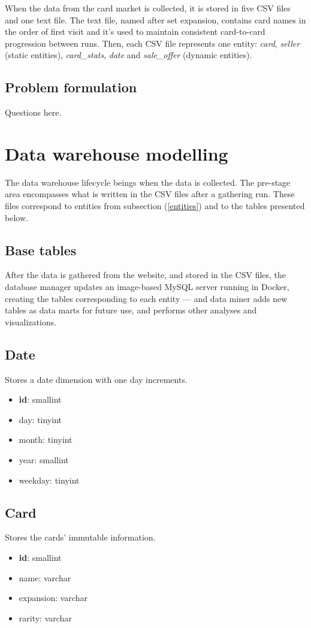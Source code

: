 When the data from the card market is collected, it is stored in five CSV files and one text file. The text file, named after set expansion, contains card names in the order of first visit and it's used to maintain consistent card-to-card progression between runs. Then, each CSV file represents one entity: \textit{card}, \textit{seller} (static entities), \textit{card\_stats}, \textit{date} and \textit{sale\_offer} (dynamic entities).

\subsection{Problem formulation}
Questions here.

\section{Data warehouse modelling}
The data warehouse lifecycle beings when the data is collected. The pre-stage area encompasses what is written in the CSV files after a gathering run. These files correspond to entities from subsection (\ref{entities}) and to the tables presented below.

\subsection{Base tables}
After the data is gathered from the website, and stored in the CSV files, the database manager updates an image-based MySQL server running in Docker, creating the tables corresponding to each entity --- and data miner adds new tables as data marts for future use, and performs other analyses and visualizations.

\subsection*{Date}
Stores a date dimension with one day increments.
\begin{itemize}
\setlength\itemsep{0.2em}
\item \textbf{id}: smallint
\item day: tinyint
\item month: tinyint
\item year: smallint
\item weekday: tinyint
\end{itemize}

\subsection*{Card}
Stores the cards' immutable information.
\begin{itemize}
\setlength\itemsep{0.2em}
\item \textbf{id}: smallint
\item name: varchar
\item expansion: varchar
\item rarity: varchar
\end{itemize}

